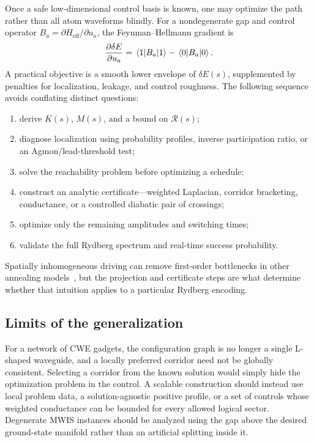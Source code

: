 Once a safe low-dimensional control basis is known, one may optimize the path
rather than all atom waveforms blindly.  For a nondegenerate gap and control
operator $B_a=\partial H_{\mathrm{eff}}/\partial u_a$, the
Feynman--Hellmann gradient is
\begin{equation}
 \frac{\partial\delta E}{\partial u_a}
 =\matrixel{1}{B_a}{1}-\matrixel{0}{B_a}{0}.
 \label{eq:mwis-gap-gradient}
\end{equation}
A practical objective is a smooth lower envelope of $\delta E(s)$, supplemented
by penalties for localization, leakage, and control roughness.  The following
sequence avoids conflating distinct questions:
\begin{enumerate}
 \item derive $K(s)$, $M(s)$, and a bound on $\mathcal R(s)$;
 \item diagnose localization using probability profiles, inverse
 participation ratio, or an Agmon/lead-threshold test;
 \item solve the reachability problem before optimizing a schedule;
 \item construct an analytic certificate---weighted Laplacian, corridor
 bracketing, conductance, or a controlled diabatic pair of crossings;
 \item optimize only the remaining amplitudes and switching times;
 \item validate the full Rydberg spectrum and real-time success probability.
\end{enumerate}
Spatially inhomogeneous driving can remove first-order bottlenecks in other
annealing models~\cite{susa2018exponential}, but the projection and certificate
steps are what determine whether that intuition applies to a particular
Rydberg encoding.

\subsection{Limits of the generalization}

For a network of CWE gadgets, the configuration graph is no longer a single
L-shaped waveguide, and a locally preferred corridor need not be globally
consistent.  Selecting a corridor from the known solution would simply hide
the optimization problem in the control.  A scalable construction should
instead use local problem data, a solution-agnostic positive profile, or a
set of controls whose weighted conductance can be bounded for every allowed
logical sector.  Degenerate MWIS instances should be analyzed using the gap
above the desired ground-state manifold rather than an artificial splitting
inside it.


